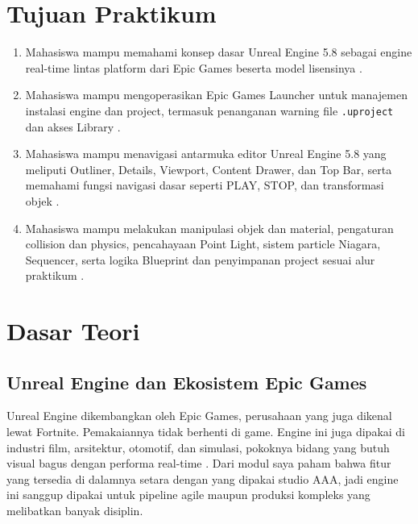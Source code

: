 \documentclass[a4paper,oneside,12pt]{report}
\begin{document}
\thispagestyle{empty}
\clearpage
{}
\thispagestyle{empty}

\tableofcontents
\clearpage

\setcounter{page}{3}

\chapter[Tujuan Praktikum]{Tujuan Praktikum}
\begin{enumerate}
   \item Mahasiswa mampu memahami konsep dasar Unreal Engine 5.8 sebagai engine real-time lintas platform dari Epic Games beserta model lisensinya \cite{epic-unreal}.
   \item Mahasiswa mampu mengoperasikan Epic Games Launcher untuk manajemen instalasi engine dan project, termasuk penanganan warning file \texttt{.uproject} dan akses Library \cite{modul2}.
   \item Mahasiswa mampu menavigasi antarmuka editor Unreal Engine 5.8 yang meliputi Outliner, Details, Viewport, Content Drawer, dan Top Bar, serta memahami fungsi navigasi dasar seperti PLAY, STOP, dan transformasi objek \cite{modul2}.
   \item Mahasiswa mampu melakukan manipulasi objek dan material, pengaturan collision dan physics, pencahayaan Point Light, sistem particle Niagara, Sequencer, serta logika Blueprint dan penyimpanan project sesuai alur praktikum \cite{epic-variants}.
\end{enumerate}
\clearpage

\chapter{Dasar Teori}

\section{Unreal Engine dan Ekosistem Epic Games}
Unreal Engine dikembangkan oleh Epic Games, perusahaan yang juga dikenal lewat Fortnite. Pemakaiannya tidak berhenti di game. Engine ini juga dipakai di industri film, arsitektur, otomotif, dan simulasi, pokoknya bidang yang butuh visual bagus dengan performa real-time \cite{modul2,epic-unreal}. Dari modul saya paham bahwa fitur yang tersedia di dalamnya setara dengan yang dipakai studio AAA, jadi engine ini sanggup dipakai untuk pipeline agile maupun produksi kompleks yang melibatkan banyak disiplin.
\end{document}
